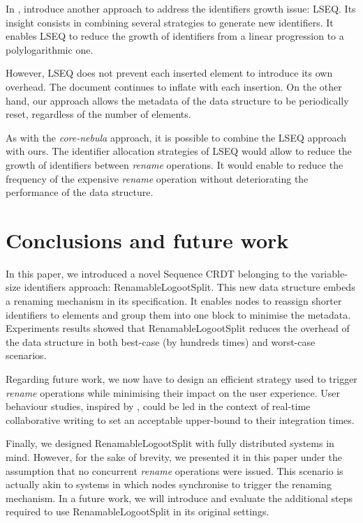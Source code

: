 \documentclass[sigplan,10pt,authorversion]{acmart}
\begin{document}
In \cite{nedelec_2013_lseq,doi:10.1002/cpe.4108}, \citeauthor{nedelec_2013_lseq} introduce another approach to address the identifiers growth issue: LSEQ.
Its insight consists in combining several strategies to generate new identifiers.
It enables LSEQ to reduce the growth of identifiers from a linear progression to a polylogarithmic one.

However, LSEQ does not prevent each inserted element to introduce its own overhead.
The document continues to inflate with each insertion.
On the other hand, our approach allows the metadata of the data structure to be periodically reset, regardless of the number of elements.

As with the \emph{core-nebula} approach, it is possible to combine the LSEQ approach with ours.
The identifier allocation strategies of LSEQ would allow to reduce the growth of identifiers between \emph{rename} operations.
It would enable to reduce the frequency of the expensive \emph{rename} operation without deteriorating the performance of the data structure.

\section{Conclusions and future work}
\label{sec:conclusion}

\begin{sloppypar}
In this paper, we introduced a novel Sequence \ac{CRDT} belonging to the variable-size identifiers approach: RenamableLogootSplit.
This new data structure embeds a renaming mechanism in its specification.
It enables nodes to reassign shorter identifiers to elements and group them into one block to minimise the metadata.
Experiments results showed that RenamableLogootSplit reduces the overhead of the data structure in both best-case (by hundreds times) and worst-case scenarios.
\end{sloppypar}

Regarding future work, we now have to design an efficient strategy used to trigger \emph{rename} operations while minimising their impact on the user experience.
User behaviour studies, inspired by \cite{ignat:hal-01088815,ignat:hal-01238831}, could be led in the context of real-time collaborative writing to set an acceptable upper-bound to their integration times.

Finally, we designed RenamableLogootSplit with fully distributed systems in mind.
However, for the sake of brevity, we presented it in this paper under the assumption that no concurrent \emph{rename} operations were issued.
This scenario is actually akin to systems in which nodes synchronise to trigger the renaming mechanism.
In a future work, we will introduce and evaluate the additional steps required to use RenamableLogootSplit in its original settings.


\end{document}
